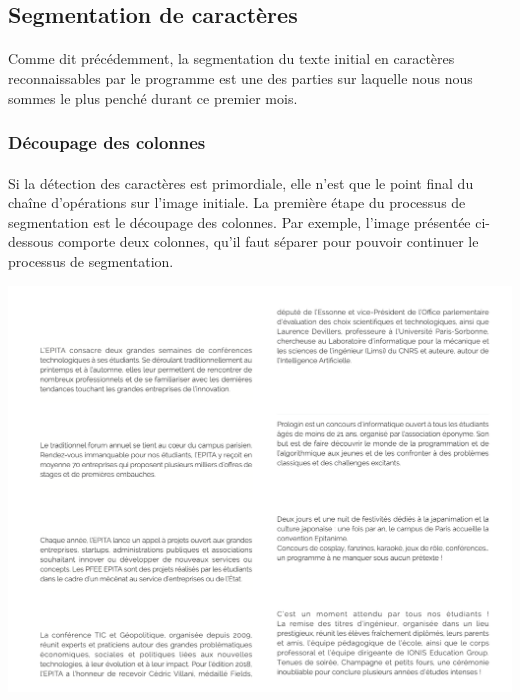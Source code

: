 \documentclass{article}
\begin{document}
\subsection{Segmentation de caractères}
    \paragraph{}
    Comme dit précédemment, la segmentation du texte initial en caractères reconnaissables par le programme est une des parties sur laquelle nous nous sommes le plus penché durant ce premier mois.
    
    \subsubsection{Découpage des colonnes}
    \paragraph{}
    Si la détection des caractères est primordiale, elle n'est que le point final du chaîne d'opérations sur l'image initiale. La première étape du processus de segmentation est le découpage des colonnes. Par exemple, l'image présentée ci-dessous comporte deux colonnes, qu'il faut séparer pour pouvoir continuer le processus de segmentation. \\
    
    \begin{center}
    	\includegraphics[scale=0.3]{paragraph}
    \end{center}
    
\end{document}
